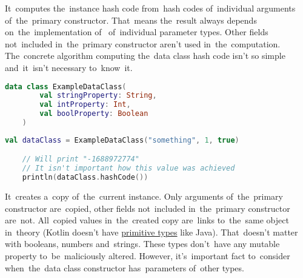 \label{kotlindataclasshashcode}
It~computes the~instance hash code from~hash codes of~individual arguments of~the~primary constructor.
That~means the~result always depends on~the~implementation \mbox{of } of~individual parameter types.
Other fields not~included in~the~primary constructor aren't used in~the~computation.
The~concrete algorithm computing the~data class hash code isn't so simple and~it~isn't necessary to~know~it.

\example
\begin{lstlisting}[language=Kotlin, title={Data class}]
    data class ExampleDataClass(
        val stringProperty: String,
        val intProperty: Int,
        val boolProperty: Boolean
    )
\end{lstlisting}
\begin{lstlisting}[language=Kotlin, title={\itq{hashCode} behavior}]
    val dataClass = ExampleDataClass("something", 1, true)

    // Will print "-1688972774"
    // It isn't important how this value was achieved
    println(dataClass.hashCode())
\end{lstlisting}
\newline

\label{kotlindataclasscopy}
It~creates a~copy of~the~current instance.
Only arguments of~the~primary constructor are~copied, other fields not~included in~the~primary constructor are~not.
All~copied values in~the~created copy are~links to~the~same object in~theory (Kotlin doesn't have \hyperref[javaprimitivetypes]{primitive types} like Java).
That~doesn't matter with booleans, numbers and~strings.
These types don't~have any mutable property to~be~maliciously altered.
However, it's~important fact to~consider when~the~data class constructor has~parameters of~other types.
\newline

